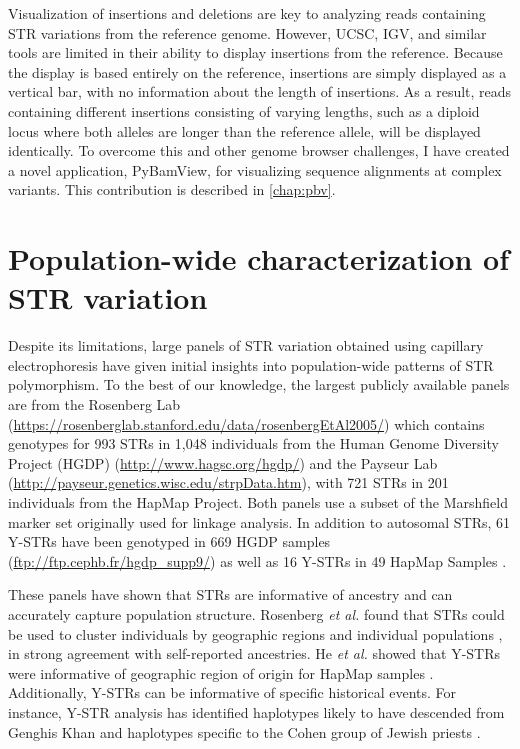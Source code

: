 Visualization of insertions and deletions are key to analyzing reads containing STR variations from the reference genome. However, UCSC, IGV, and similar tools are limited in their ability to display insertions from the reference. Because the display is based entirely on the reference, insertions are simply displayed as a vertical bar, with no information about the length of insertions. As a result, reads containing different insertions consisting of varying lengths, such as a diploid locus where both alleles are longer than the reference allele, will be displayed identically. To overcome this and other genome browser challenges, I have created a novel application, PyBamView, for visualizing sequence alignments at complex variants. This contribution is described in \autoref{chap:pbv}.

\section{Population-wide characterization of STR variation}
Despite its limitations, large panels of STR variation obtained using capillary electrophoresis have  given initial insights into population-wide patterns of STR polymorphism. To the best of our knowledge, the largest publicly available panels are from the Rosenberg Lab (\url{https://rosenberglab.stanford.edu/data/rosenbergEtAl2005/}) which contains genotypes for 993 STRs in 1,048 individuals from the Human Genome Diversity Project (HGDP) (\url{http://www.hagsc.org/hgdp/}) and the Payseur Lab (\url{http://payseur.genetics.wisc.edu/strpData.htm}), with 721 STRs in 201 individuals from the HapMap Project. Both panels use a subset of the Marshfield marker set originally used for linkage analysis. In addition to autosomal STRs, 61 Y-STRs have been genotyped in 669 HGDP samples (\url{ftp://ftp.cephb.fr/hgdp_supp9/}) as well as 16 Y-STRs in 49 HapMap Samples \cite{HeGitschierZerjalEtAl2009}.

These panels have shown that STRs are informative of ancestry and can accurately capture population structure. Rosenberg \emph{et al.} found that STRs could be used to cluster individuals by geographic regions and individual populations \cite{RosenbergPritchardWeberEtAl2002}, in strong agreement with self-reported ancestries. He \emph{et al.} showed that Y-STRs were informative of geographic region of origin for HapMap samples \cite{HeGitschierZerjalEtAl2009}. Additionally, Y-STRs can be informative of specific historical events. For instance, Y-STR analysis has identified haplotypes likely to have descended from Genghis Khan \cite{ZerjalXueBertorelleEtAl2003} and haplotypes specific to the Cohen group of Jewish priests \cite{SkoreckiSeligBlazerEtAl1997}.

